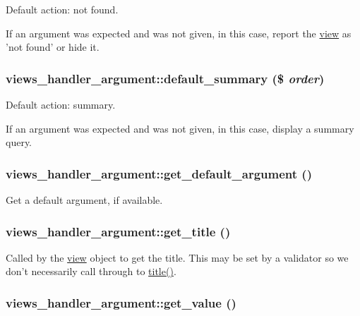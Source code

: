 Default action: not found.

If an argument was expected and was not given, in this case, report the \hyperlink{classview}{view} as 'not found' or hide it. \hypertarget{classviews__handler__argument_c74b6bb7bc136e4ac0883849dd532f73}{
\subsubsection[{default\_\-summary}]{\setlength{\rightskip}{0pt plus 5cm}views\_\-handler\_\-argument::default\_\-summary (\$ {\em order})}}
\label{classviews__handler__argument_c74b6bb7bc136e4ac0883849dd532f73}


Default action: summary.

If an argument was expected and was not given, in this case, display a summary query. \hypertarget{classviews__handler__argument_4362d110d5cb6c7aa46770974289dbaf}{
\subsubsection[{get\_\-default\_\-argument}]{\setlength{\rightskip}{0pt plus 5cm}views\_\-handler\_\-argument::get\_\-default\_\-argument ()}}
\label{classviews__handler__argument_4362d110d5cb6c7aa46770974289dbaf}


Get a default argument, if available. \hypertarget{classviews__handler__argument_45cf1f97b44753f32f6e4af75a4c881f}{
\subsubsection[{get\_\-title}]{\setlength{\rightskip}{0pt plus 5cm}views\_\-handler\_\-argument::get\_\-title ()}}
\label{classviews__handler__argument_45cf1f97b44753f32f6e4af75a4c881f}


Called by the \hyperlink{classview}{view} object to get the title. This may be set by a validator so we don't necessarily call through to \hyperlink{classviews__handler__argument_76181ac24e7be4a09aaafc1fa5f15ea1}{title()}. \hypertarget{classviews__handler__argument_33540b3014b46e56646b03168468b981}{
\subsubsection[{get\_\-value}]{\setlength{\rightskip}{0pt plus 5cm}views\_\-handler\_\-argument::get\_\-value ()}}
\label{classviews__handler__argument_33540b3014b46e56646b03168468b981}


